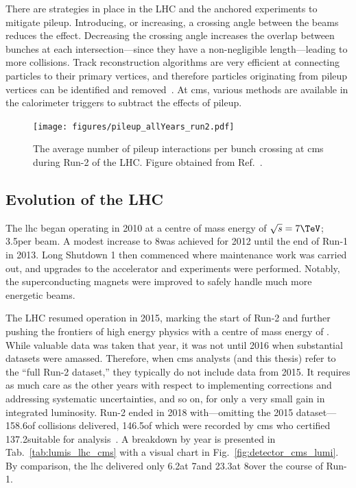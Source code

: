 There are strategies in place in the LHC and the anchored experiments to mitigate \gls{pileup}. Introducing, or increasing, a crossing angle between the beams reduces the effect. Decreasing the crossing angle increases the overlap between bunches at each intersection---since they have a non-negligible length---leading to more collisions. Track reconstruction algorithms are very efficient at connecting particles to their primary vertices, and therefore particles originating from \gls{pileup} vertices can be identified and removed~\cite{Chatrchyan:2014fea,Aaboud:2017all}. At \acrshort{cms}, various methods are available in the calorimeter triggers to subtract the effects of \gls{pileup}.

\begin{figure}[htbp]
    \centering
    \texttt{[image: figures/pileup\_allYears\_run2.pdf]}
    \caption[The average number of pileup interactions per bunch crossing at CMS during Run-2 of the LHC]{The average number of \gls{pileup} interactions per bunch crossing at \acrshort{cms} during Run-2 of the LHC. Figure obtained from Ref.~.}
    \label{fig:detector_cms_pileup}
\end{figure}




\subsection{Evolution of the LHC}
\label{subsec:evolution_lhc}

The \acrshort{lhc} began operating in 2010 at a centre of mass energy of $\sqrt{s} = \text{7}\TeV$; 3.5\TeV per beam. A modest increase to 8\TeV was achieved for 2012 until the end of Run-1 in 2013. Long Shutdown 1 then commenced where maintenance work was carried out, and upgrades to the accelerator and experiments were performed. Notably, the superconducting magnets were improved to safely handle much more energetic beams.

The LHC resumed operation in 2015, marking the start of Run-2 and further pushing the frontiers of high energy physics with a centre of mass energy of \comruntwo. While valuable data was taken that year, it was not until 2016 when substantial datasets were amassed. Therefore, when \acrshort{cms} analysts (and this thesis) refer to the ``full Run-2 dataset,'' they typically do not include data from 2015. It requires as much care as the other years with respect to implementing corrections and addressing systematic uncertainties, and so on, for only a very small gain in integrated luminosity. Run-2 ended in 2018 with---omitting the 2015 dataset---158.6\fbinv of \pp collisions delivered, 146.5\fbinv of which were recorded by \acrshort{cms} who certified 137.2\fbinv suitable for analysis~\cite{cmslumitwikipage,cmslumipogpage}. A breakdown by year is presented in Tab.~\ref{tab:lumis_lhc_cms} with a visual chart in Fig.~\ref{fig:detector_cms_lumi}. By comparison, the \acrshort{lhc} delivered only 6.2\fbinv at 7\TeV and 23.3\fbinv at 8\TeV over the course of Run-1.

